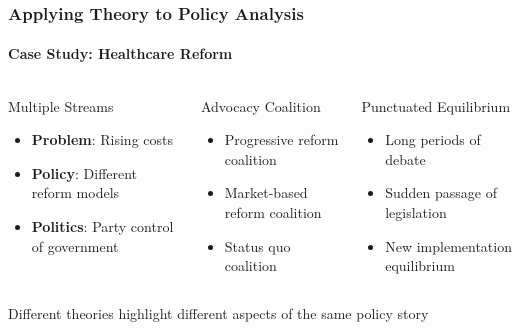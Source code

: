 \documentclass[10pt]{beamer}
\begin{document}
\begin{frame}
\frametitle{Applying Theory to Policy Analysis}
\framesubtitle{Case Study: Healthcare Reform}

\begin{columns}
  \begin{column}{0.32\textwidth}
    \begin{block}{\textcolor{streamblue}{Multiple Streams}}
      \begin{itemize}
        \item \textbf{Problem}: Rising costs
        \item \textbf{Policy}: Different reform models
        \item \textbf{Politics}: Party control of government
      \end{itemize}
    \end{block}
  \end{column}

  \begin{column}{0.32\textwidth}
    \begin{block}{\textcolor{coalitionred}{Advocacy Coalition}}
      \begin{itemize}
        \item Progressive reform coalition
        \item Market-based reform coalition
        \item Status quo coalition
      \end{itemize}
    \end{block}
  \end{column}

  \begin{column}{0.32\textwidth}
    \begin{block}{\textcolor{punctuationorange}{Punctuated Equilibrium}}
      \begin{itemize}
        \item Long periods of debate
        \item Sudden passage of legislation
        \item New implementation equilibrium
      \end{itemize}
    \end{block}
  \end{column}
\end{columns}

\vspace{1cm}
\centering
Different theories highlight different aspects of the same policy story

\end{frame}
\end{document}
